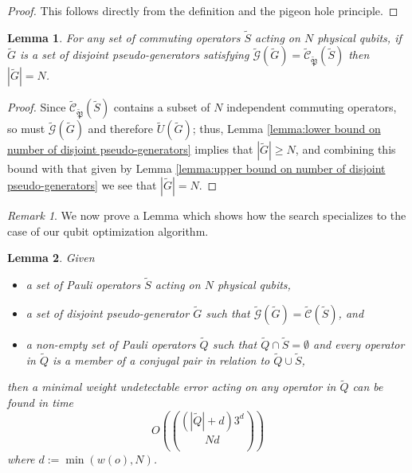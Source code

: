 \documentclass[12pt]{amsbook}
\theoremstyle{plain}
\newtheorem{lemma}{Lemma}
\theoremstyle{definition}
\theoremstyle{remark}
\newtheorem{remark}{Remark}
\newcommand{\set}{\tilde}
\newcommand{\genfun}{\tilde{\mathcal{G}}}
\newcommand{\pauligroup}{{\set{\mathfrak{P}}}}
\newcommand{\centralizer}{\set{\mathcal{C}}}
\newcommand{\paren}[1]{\left(#1\right)}
\begin{document}
\begin{proof}
This follows directly from the definition and the pigeon hole principle.
\end{proof}

\begin{lemma}
\label{lemma:exact bound on number of disjoint pseudo-generators}
For any set of commuting operators $\set S$ acting on $N$ physical qubits, if $\set G$ is a set of disjoint pseudo-generators satisfying $\genfun(\set G)=\centralizer_\pauligroup(\set S)$ then $|\set G|= N$.
\end{lemma}

\begin{proof}
Since $\centralizer_\pauligroup(\set S)$ contains a subset of $N$ independent commuting operators, so must $\genfun(\set G)$ and therefore $\set U(\set G)$;  thus, Lemma \ref{lemma:lower bound on number of disjoint pseudo-generators} implies that $|\set G|\ge N$, and combining this bound with that given by Lemma \ref{lemma:upper bound on number of disjoint pseudo-generators} we see that $|\set G|=N$.
\end{proof}
\begin{remark}
We now prove a Lemma which shows how the search specializes to the case of our qubit optimization algorithm.
\end{remark}

\begin{lemma}
\label{lemma:search for minimal weight undetectable error}
Given
\begin{itemize}
\item a set of Pauli operators $\set S$ acting on $N$ physical qubits,
\item a set of disjoint pseudo-generator $\set G$ such that $\genfun(\set G)=\centralizer(\set S)$, and
\item a non-empty set of Pauli operators $\set Q$ such that $\set Q\cap\set S=\emptyset$ and every operator in $\set Q$ is a member of a conjugal pair in relation to $\set Q \cup \set S$,
\end{itemize}
then a minimal weight undetectable error acting on any operator in $\set Q$ can be found in time $$O\paren{(|\set Q|+d)3^d\choose{N}{d}}$$ where $d:=\min\paren{w(o),N}$.
\end{lemma}
\end{document}

